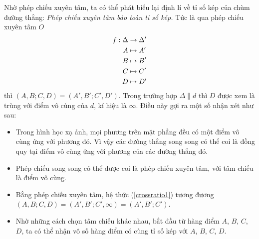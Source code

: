        Nhờ phép chiếu xuyên tâm, ta có thể phát biểu lại định lí về tỉ số kép của chùm đường thẳng: \textit{Phép chiếu xuyên tâm bảo toàn tỉ số kép.} Tức là qua phép chiếu xuyên tâm \(O\)
        \begin{equation}
            \begin{aligned}
                f: \Delta & \to \Delta' \\
                A & \mapsto A' \\
                B & \mapsto B' \\
                C & \mapsto C' \\
                D & \mapsto D'
            \end{aligned}
            \notag
        \end{equation}
        thì \((A,B;C,D) = (A',B';C',D')\). Trong trường hợp \(\Delta \parallel d\) thì \(D\) được xem là trùng với điểm vô cùng của \(d\), kí hiệu là \(\infty\). Điều này gợi ra một số nhận xét như sau:
        \begin{itemize}
            \item Trong hình học xạ ảnh, mọi phương trên mặt phẳng đều có một điểm vô cùng ứng với phương đó. Vì vậy các đường thẳng song song có thể coi là đồng quy tại điểm vô cùng ứng với phương của các đường thẳng đó.
            \item Phép chiếu song song có thể được coi là phép chiếu xuyên tâm, với tâm chiếu là điểm vô cùng.
            \item Bằng phép chiếu xuyên tâm, hệ thức (\ref{crossratio1}) tương đương \((A,B;C,D) = (A',B';C',\infty) = (A',B';C')\).
            \item Nhờ những cách chọn tâm chiếu khác nhau, bắt đầu từ hàng điểm \(A\), \(B\), \(C\), \(D\), ta có thể nhận vô số hàng điểm có cùng tỉ số kép với \(A\), \(B\), \(C\), \(D\).
        \end{itemize}

